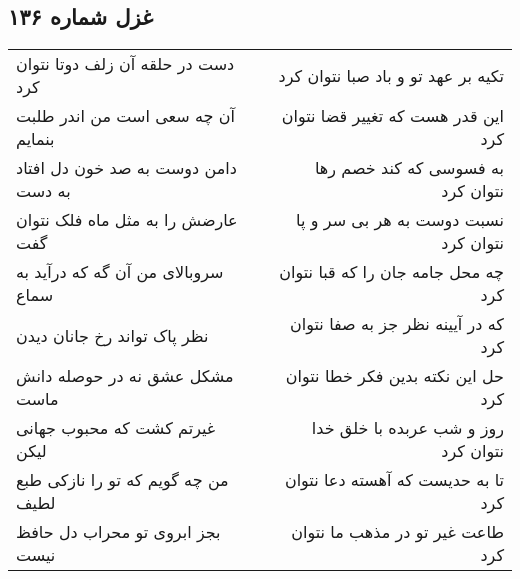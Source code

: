 \begin{center}
\section*{غزل شماره ۱۳۶}
\label{sec:sh136}
\begin{longtable}{l p{0.5cm} r}
دست در حلقه آن زلف دوتا نتوان کرد
&&
تکیه بر عهد تو و باد صبا نتوان کرد
\\
آن چه سعی است من اندر طلبت بنمایم
&&
این قدر هست که تغییر قضا نتوان کرد
\\
دامن دوست به صد خون دل افتاد به دست
&&
به فسوسی که کند خصم رها نتوان کرد
\\
عارضش را به مثل ماه فلک نتوان گفت
&&
نسبت دوست به هر بی سر و پا نتوان کرد
\\
سروبالای من آن گه که درآید به سماع
&&
چه محل جامه جان را که قبا نتوان کرد
\\
نظر پاک تواند رخ جانان دیدن
&&
که در آیینه نظر جز به صفا نتوان کرد
\\
مشکل عشق نه در حوصله دانش ماست
&&
حل این نکته بدین فکر خطا نتوان کرد
\\
غیرتم کشت که محبوب جهانی لیکن
&&
روز و شب عربده با خلق خدا نتوان کرد
\\
من چه گویم که تو را نازکی طبع لطیف
&&
تا به حدیست که آهسته دعا نتوان کرد
\\
بجز ابروی تو محراب دل حافظ نیست
&&
طاعت غیر تو در مذهب ما نتوان کرد
\\
\end{longtable}
\end{center}
